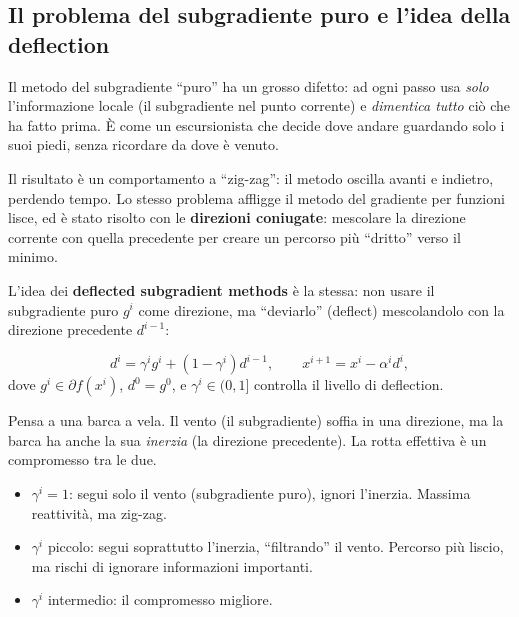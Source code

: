 \documentclass[a4paper,11pt]{article}
\theoremstyle{definition}
\begin{document}
\subsection{Il problema del subgradiente puro e l'idea della deflection}
\label{subsec:defl_idea}

\begin{intuizione}
Il metodo del subgradiente ``puro'' ha un grosso difetto: ad ogni passo usa \emph{solo} l'informazione locale (il subgradiente nel punto corrente) e \emph{dimentica tutto} ciò che ha fatto prima. È come un escursionista che decide dove andare guardando solo i suoi piedi, senza ricordare da dove è venuto.

Il risultato è un comportamento a ``zig-zag'': il metodo oscilla avanti e indietro, perdendo tempo. Lo stesso problema affligge il metodo del gradiente per funzioni lisce, ed è stato risolto con le \textbf{direzioni coniugate}: mescolare la direzione corrente con quella precedente per creare un percorso più ``dritto'' verso il minimo.

L'idea dei \textbf{deflected subgradient methods} \cite{dantonio2009,opt-slides-5} è la stessa: non usare il subgradiente puro $g^i$ come direzione, ma ``deviarlo'' (deflect) mescolandolo con la direzione precedente $d^{i-1}$:
\end{intuizione}

\begin{equation}\label{eq:deflected_dir}
  d^i = \gamma^i g^i + (1 - \gamma^i) d^{i-1}, \qquad x^{i+1} = x^i - \alpha^i d^i,
\end{equation}
dove $g^i \in \partial f(x^i)$, $d^0 = g^0$, e $\gamma^i \in (0, 1]$ controlla il livello di deflection.

\begin{analogia}
Pensa a una barca a vela. Il vento (il subgradiente) soffia in una direzione, ma la barca ha anche la sua \emph{inerzia} (la direzione precedente). La rotta effettiva è un compromesso tra le due.
\begin{itemize}[nosep]
  \item $\gamma^i = 1$: segui solo il vento (subgradiente puro), ignori l'inerzia. Massima reattività, ma zig-zag.
  \item $\gamma^i$ piccolo: segui soprattutto l'inerzia, ``filtrando'' il vento. Percorso più liscio, ma rischi di ignorare informazioni importanti.
  \item $\gamma^i$ intermedio: il compromesso migliore.
\end{itemize}
\end{analogia}
\end{document}
